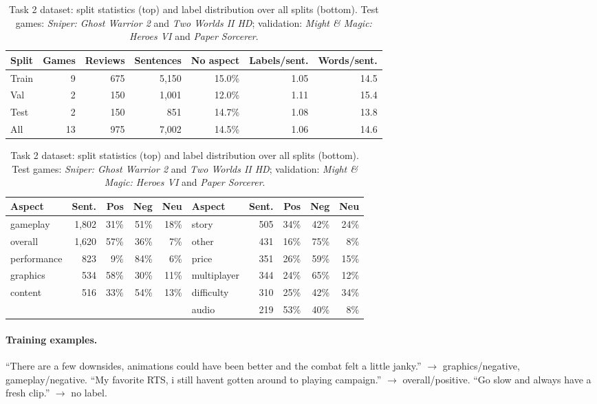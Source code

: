 \documentclass[11pt,a4paper]{article}
\begin{document}
\begin{table}[t]
  \centering
  \small
  \begin{tabular}{lrrrrrr}
    \toprule
    Split & Games & Reviews & Sentences & No aspect & Labels/sent. & Words/sent. \\
    \midrule
    Train & 9 & 675 & 5,150 & 15.0\% & 1.05 & 14.5 \\
    Val & 2 & 150 & 1,001 & 12.0\% & 1.11 & 15.4 \\
    Test & 2 & 150 & 851 & 14.7\% & 1.08 & 13.8 \\
    \midrule
    All & 13 & 975 & 7,002 & 14.5\% & 1.06 & 14.6 \\
    \bottomrule
  \end{tabular}

  \vspace{0.6em}
  \begin{tabular}{lrrrr|lrrrr}
    \toprule
    Aspect & Sent. & Pos & Neg & Neu & Aspect & Sent. & Pos & Neg & Neu \\
    \midrule
    gameplay & 1,802 & 31\% & 51\% & 18\% & story & 505 & 34\% & 42\% & 24\% \\
    overall & 1,620 & 57\% & 36\% & 7\% & other & 431 & 16\% & 75\% & 8\% \\
    performance & 823 & 9\% & 84\% & 6\% & price & 351 & 26\% & 59\% & 15\% \\
    graphics & 534 & 58\% & 30\% & 11\% & multiplayer & 344 & 24\% & 65\% & 12\% \\
    content & 516 & 33\% & 54\% & 13\% & difficulty & 310 & 25\% & 42\% & 34\% \\
    & & & & & audio & 219 & 53\% & 40\% & 8\% \\
    \bottomrule
  \end{tabular}
  \caption{Task 2 dataset: split statistics (top) and label distribution over all splits
  (bottom). Test games: \emph{Sniper: Ghost Warrior 2} and \emph{Two Worlds II HD};
  validation: \emph{Might \& Magic: Heroes VI} and \emph{Paper Sorcerer}.}
  \label{tab:t2data}
\end{table}

\paragraph{Training examples.} ``There are a few downsides, animations could have been better
and the combat felt a little janky.'' $\rightarrow$ graphics/negative, gameplay/negative.
``My favorite RTS, i still havent gotten around to playing campaign.'' $\rightarrow$
overall/positive. ``Go slow and always have a fresh clip.'' $\rightarrow$ no label.
\end{document}
